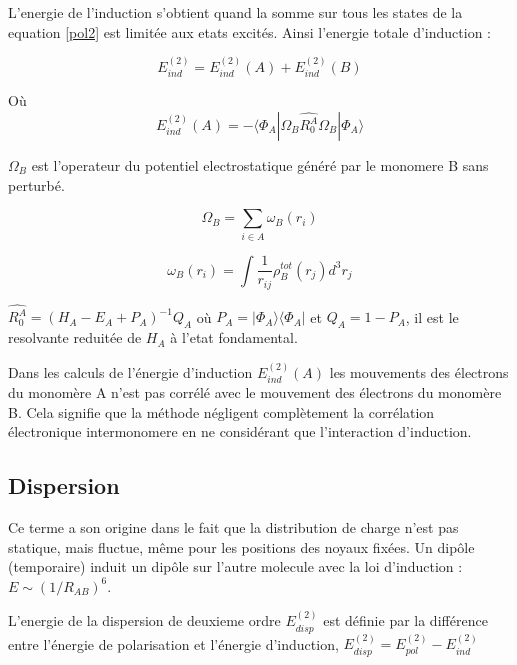 L'energie de l'induction s'obtient quand la somme sur tous les states de la equation \ref{pol2} est limitée aux etats excités. Ainsi l'energie totale d'induction : 

\begin{equation}
E_{ind}^{(2)} = E_{ind}^{(2)}(A) + E_{ind}^{(2)}(B) \label{ind}
\end{equation}
		
Où  \begin{equation}
E_{ind}^{(2)}(A) = -\langle \Phi_{A}|\Omega_{B}\hat{R_{0}^{A}}\Omega_{B}| \Phi_{A} \rangle  \label{indA}
\end{equation}		

$\Omega_{B}$ est l'operateur du potentiel electrostatique généré par le monomere B sans perturbé. 

\begin{equation}
\Omega_{B} = \sum_{i\in A} \omega_{B}(r_{i})
\end{equation}

\begin{equation}
\omega_{B}(r_{i}) = \int \frac{1}{r_{ij}} \rho_{B}^{tot}(r_{j}) d^{3}r_{j}
\end{equation}

$\hat{R_{0}^{A}} = (H_{A}- E_{A} + P_{A})^{-1}Q_{A}$ où $P_{A} = |\Phi_{A}\rangle \langle \Phi_{A}|$ et $Q_{A} = 1- P_{A}$, il est le resolvante reduitée de $H_{A}$ à l'etat fondamental. 


Dans les calculs de l'énergie d'induction $E_{ind}^{(2)}(A)$ les mouvements des électrons du monomère A n'est pas corrélé avec le mouvement des électrons du monomère B. Cela signifie que la méthode négligent complètement la corrélation électronique intermonomere en ne considérant que l'interaction d'induction.  

\subsection{Dispersion}

Ce terme a son origine dans le fait que la distribution de charge n'est pas statique, mais fluctue, même pour les positions des noyaux fixées. Un dipôle (temporaire) induit un dipôle sur l'autre molecule avec la loi d'induction : $E\sim (1/R_{AB})^{6}$.

L'energie de la dispersion de deuxieme ordre $E_{disp}^{(2)}$ est définie par la différence entre l'énergie de polarisation et l'énergie d'induction, $E_{disp}^{(2)} = E_{pol}^{(2)} - E_{ind}^{(2)}$
	
